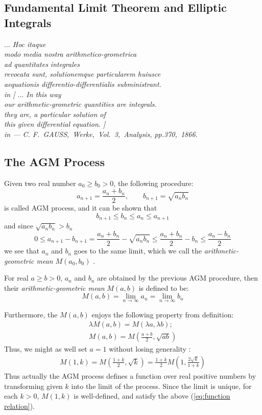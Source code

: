\documentclass{report}
\begin{document}
\begin{titlepage}
\chapter{Fundamental Limit Theorem and Elliptic Integrals}
{\flushright
	{\sffamily\slshape
		$\ldots$ Hoc itaque\\
		 modo media nostra arithmetico-grometrica\\
		  ad quantitates integrales\\
		 revocata sunt, solutionemque particularem huiusce\\
		  aequationis differentio-differentialis subministrant.\\
		   in
		  [ $\ldots$ In this way\\
		   our arithmetic-grometric quantities are integrals.\\
		   they are, a particular solution of \\
		   this given differential equation. ]\\
		    in
		{\sffamily\upshape --- C. F.~GAUSS,~{\it Werke},~Vol.~3,~{\it Analysis}, pp.370,~1866.\cite{Wernicke:1904aa}}
	}	
\vskip 1.5in 
}
\section{The AGM Process\hfill}
%
Given two real number $a_0\ge b_0>0$, the following procedure:
$$
a_{n+1}=\frac{a_n+b_n}{2},\qquad b_{n+1}=\sqrt{a_nb_n}
$$
is called AGM process, and it can be shown that
$$
b_{n+1}\leq b_n\leq a_n\leq a_{n+1}
$$
and since $\sqrt{a_nb_n}>b_n$
$$
0\leq a_{n+1}-b_{n+1}=\frac{a_n+b_n}{2}-\sqrt{a_nb_n}\leq\frac{a_n+b_n}{2}-b_n\leq\frac{a_n-b_n}{2}
$$
we see that $a_n$ and $b_n$ goes to the same limit, which we call the {\it arithmetic-geometric mean} $M(a_0,b_0)$ \cite{Borwein:1987aa}.
\eject
\begin{D} For real $a\ge b>0$, $a_n$ and $b_n$ are obtained by the previous AGM procedure, then their {\it arithmetic-geometric mean} $M(a,b)$ is defined to be:
$$
M(a,b)=\lim_{n\to\infty}a_n=\lim_{n\to\infty}b_n
$$
\end{D}
Furthermore, the $M(a,b)$ enjoys the following property from definition:
\begin{align}
\lambda M(a,b)=M(\lambda a,\lambda b);\\
M(a,b)=M\left(\frac{a+b}{2},\sqrt{ab}\right)
\end{align}
Thus, we might as well set $a=1$ without losing generality \cite{Borwein:1987aa}\cite{Wernicke:1904aa}:
\begin{align}
M(1,k)=M\left(\frac{1+k}{2},\sqrt{k}\right)=\frac{1+k}{2}M\left(1,\frac{2\sqrt{k}}{1+k}\right)
\label{eq:function relation}
\end{align}
Thus actually the AGM process defines a function over real positive numbers by transforming given $k$ into the limit of the process. Since the limit is unique, for each $k>0$, $M(1,k)$ is well-defined, and satisfy the above (\ref{eq:function relation}).
\bigskip


\end{titlepage}
\end{document}
